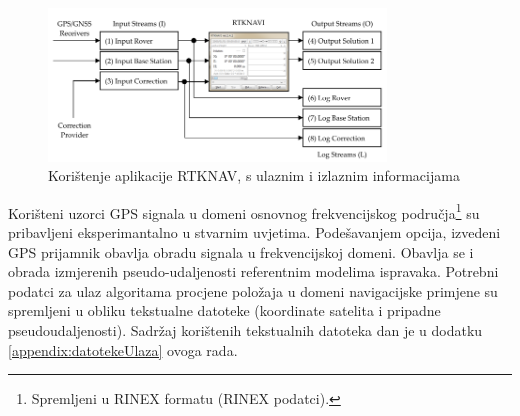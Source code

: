 \documentclass[a4paper,twoside,12pt]{memoir} %
\begin{document}
\begin{figure}[H]
	\centering
	\includegraphics[width=0.8\textwidth]{rtkNavKo}
	\caption{Korištenje aplikacije RTKNAV, s ulaznim i izlaznim informacijama}
	\label{Fig:rtkNavKo}	
\end{figure}

Korišteni uzorci GPS signala u domeni osnovnog frekvencijskog područja\footnote{Spremljeni u RINEX formatu (RINEX podatci).} su pribavljeni eksperimantalno %
u stvarnim uvjetima.
Podešavanjem opcija, izvedeni GPS prijamnik obavlja obradu signala u frekvencijskoj domeni.
Obavlja se i obrada izmjerenih pseudo-udaljenosti referentnim modelima ispravaka.
Potrebni podatci za ulaz 
algoritama procjene položaja u domeni navigacijske primjene su spremljeni u obliku tekstualne datoteke (koordinate satelita i pripadne pseudoudaljenosti). Sadržaj korištenih tekstualnih datoteka dan je u dodatku \ref{appendix:datotekeUlaza} ovoga rada.

%
\end{document}
